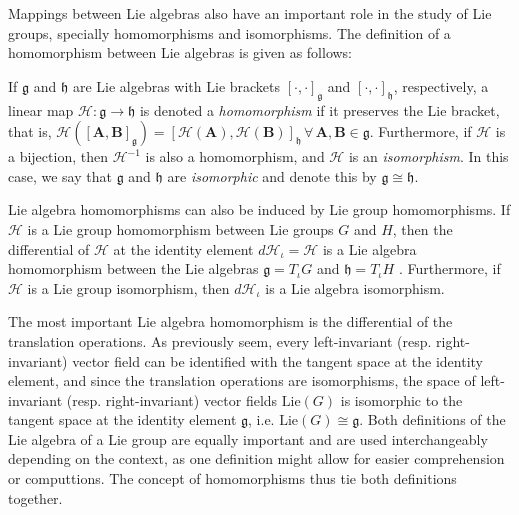 Mappings between Lie algebras also have an important role in the study of Lie groups, specially homomorphisms and isomorphisms. The definition of a homomorphism between Lie algebras is given as follows:
\begin{definition}
    If $\mathfrak{g}$ and $\mathfrak{h}$ are Lie algebras with Lie brackets $[\cdot, \cdot]_\mathfrak{g}$ and $[\cdot, \cdot]_\mathfrak{h}$, respectively, a linear map $\mathscr{H}:\mathfrak{g}\to\mathfrak{h}$ is denoted a \emph{homomorphism} if it preserves the Lie bracket, that is, $\mathscr{H}([\mathbf{A}, \mathbf{B}]_\mathfrak{g}) = [\mathscr{H}(\mathbf{A}), \mathscr{H}(\mathbf{B})]_\mathfrak{h}\,\forall\, \mathbf{A},\mathbf{B}\in\mathfrak{g}$. Furthermore, if $\mathscr{H}$ is a bijection, then $\mathscr{H}^{-1}$ is also a homomorphism, and $\mathscr{H}$ is an \emph{isomorphism}. In this case, we say that $\mathfrak{g}$ and $\mathfrak{h}$ are \emph{isomorphic} and denote this by $\mathfrak{g}\cong\mathfrak{h}$.
\end{definition}
Lie algebra homomorphisms can also be induced by Lie group homomorphisms. If $\mathcal{H}$ is a Lie group homomorphism between Lie groups $G$ and $H$, then the differential of $\mathcal{H}$ at the identity element $d\mathcal{H}_\iota=\mathscr{H}$ is a Lie algebra homomorphism between the Lie algebras $\mathfrak{g}=T_\iota G$ and $\mathfrak{h}=T_\iota H$ \citep[p. 41]{Duistermaat2012}. Furthermore, if $\mathcal{H}$ is a Lie group isomorphism, then $d\mathcal{H}_\iota$ is a Lie algebra isomorphism.

The most important Lie algebra homomorphism is the differential of the translation operations. As previously seem, every left-invariant (resp. right-invariant) vector field can be identified with the tangent space at the identity element, and since the translation operations are isomorphisms, the space of left-invariant (resp. right-invariant) vector fields $\text{Lie}(G)$ is isomorphic to the tangent space at the identity element $\mathfrak{g}$, i.e. $\text{Lie}(G)\cong\mathfrak{g}$. Both definitions of the Lie algebra of a Lie group are equally important and are used interchangeably depending on the context, as one definition might allow for easier comprehension or computtions. The concept of homomorphisms thus tie both definitions together.
